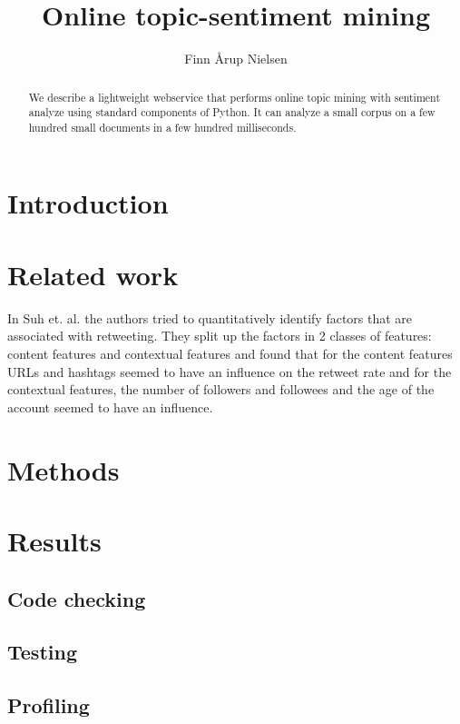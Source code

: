 \documentclass[10pt]{IEEEtran}
\title{Online topic-sentiment mining}
\author{Finn Årup Nielsen}
\begin{document}
\maketitle

\begin{abstract}
We describe a lightweight webservice that performs online topic mining
with sentiment analyze using standard components of Python.
It can analyze a small corpus on a few hundred small documents in a
few hundred milliseconds.
\end{abstract}

\section{Introduction}


\section{Related work}

In Suh et. al. \cite{want_to_be_retweeted} the authors tried to quantitatively identify factors that are associated with retweeting. They split up the factors in 2 classes of features: content features and contextual features and found that for the content features URLs and hashtags seemed to have an influence on the retweet rate and for the contextual features, the number of followers and followees and the age of the account seemed to have an influence. 

\section{Methods}



\section{Results}



\subsection{Code checking}



\subsection{Testing}



\subsection{Profiling}
\end{document}
